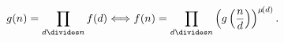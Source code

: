 \[g(n)=\prod_{d\divides n}f(d)\Longleftrightarrow f(n)=\prod_{d\divides n}\left(%
g\left(\frac{n}{d}\right)\right)^{\mathop{\mu\/}\nolimits\!\left(d\right)}.\]
